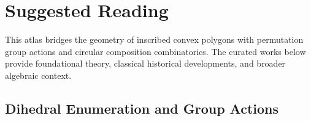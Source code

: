 \chapter*{Suggested Reading}

This atlas bridges the geometry of inscribed convex polygons with permutation group actions and circular composition combinatorics. The curated works below provide foundational theory, classical historical developments, and broader algebraic context.

\section*{Dihedral Enumeration and Group Actions}

